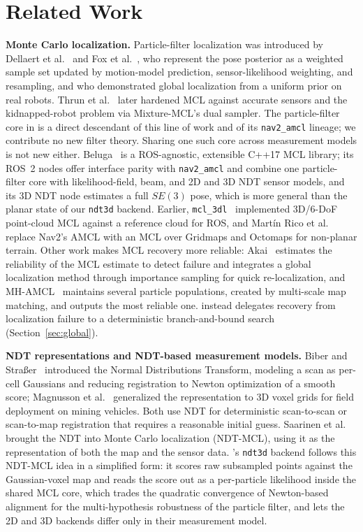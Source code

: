 \section{Related Work}\label{sec:related}

\textbf{Monte Carlo localization.}
Particle-filter localization was introduced by Dellaert et
al.~\cite{dellaert1999montecarlo} and Fox et
al.~\cite{fox1999efficient}, who represent the pose posterior as a
weighted sample set updated by motion-model prediction,
sensor-likelihood weighting, and resampling, and who demonstrated
global localization from a uniform prior on real robots. Thrun et
al.~\cite{thrun2001robust} later hardened MCL against accurate sensors
and the kidnapped-robot problem via Mixture-MCL's dual sampler. The
particle-filter core in \prismloc{} is a direct descendant of
this line of work and of its \texttt{nav2\_amcl} lineage; we contribute
no new filter theory. Sharing one such core across measurement models
is not new either. Beluga~\cite{puga2024beluga,ekumen2022belugarepo} is
a ROS-agnostic, extensible C++17 MCL library; its ROS~2 nodes offer
interface parity with \texttt{nav2\_amcl} and combine one
particle-filter core with likelihood-field, beam, and 2D and 3D NDT
sensor models, and its 3D NDT node estimates a full $SE(3)$ pose, which
is more general than the planar state of our \texttt{ndt3d} backend.
Earlier, \texttt{mcl\_3dl}~\cite{watanabe2016mcl3dl} implemented
3D/6-DoF point-cloud MCL against a reference cloud for ROS, and
Mart\'in Rico et al.~\cite{martinrico2023nonplanar} replace Nav2's AMCL
with an MCL over Gridmaps and Octomaps for non-planar terrain. Other
work makes MCL recovery more reliable: Akai~\cite{akai2023reliable}
estimates the reliability of the MCL estimate to detect failure and
integrates a global localization method through importance sampling for
quick re-localization, and MH-AMCL~\cite{garcia2023mhamcl} maintains
several particle populations, created by multi-scale map matching, and
outputs the most reliable one. \prismloc{} instead delegates recovery
from localization failure to a deterministic branch-and-bound search
(Section~\ref{sec:global}).

\textbf{NDT representations and NDT-based measurement models.}
Biber and Stra{\ss}er~\cite{biber2003ndt} introduced the Normal
Distributions Transform, modeling a scan as per-cell Gaussians and
reducing registration to Newton optimization of a smooth score;
Magnusson et al.~\cite{magnusson2007scan} generalized the
representation to 3D voxel grids for field deployment on mining
vehicles. Both use NDT for deterministic scan-to-scan or scan-to-map
registration that requires a reasonable initial guess. Saarinen et
al.~\cite{saarinen2013ndtmcl} brought the NDT into Monte Carlo
localization (NDT-MCL), using it as the representation of both the map
and the sensor data. \prismloc's \texttt{ndt3d} backend follows this
NDT-MCL idea in a simplified form: it scores raw subsampled points
against the Gaussian-voxel map and reads the score out as a
per-particle likelihood inside the shared MCL core, which trades the
quadratic convergence of Newton-based alignment for the
multi-hypothesis robustness of the particle filter, and lets the 2D and
3D backends differ only in their measurement model.

